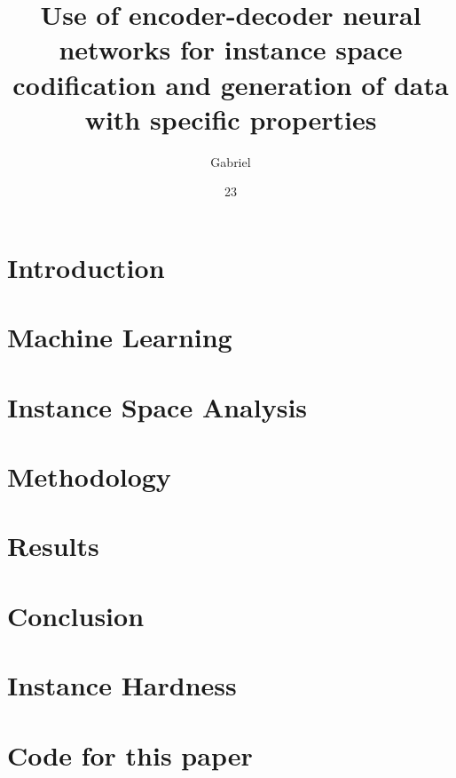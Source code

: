 \documentclass[tg, eng]{ita}    %
\author{Gabriel}{Barbosa Martinz}
\title{Use of encoder-decoder neural networks for instance space codification and generation of data with specific properties}
\date{23}{June}{2023}
\begin{document}

\mainmatter

\chapter{Introduction}


\chapter{Machine Learning} \label{ch:machinelearning}


\chapter{Instance Space Analysis} \label{ch:isa}


\chapter{Methodology} \label{ch:methodology}


\chapter{Results} \label{ch:results} 


\chapter{Conclusion} \label{ch:conclusion}


\renewcommand\bibname{\itareferencesnamebabel} %


\appendix
\chapter{Instance Hardness} \label{ch:instance_hardness} %


\chapter{Code for this paper} \label{ch:code}


%
\end{document}
